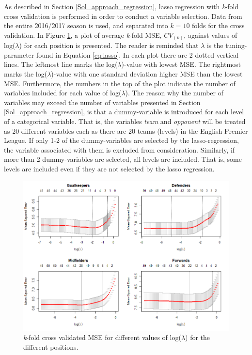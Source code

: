 As described in Section \ref{Sol_approach_regression}, lasso regression with \textit{k}-fold cross validation is performed in order to conduct a variable selection. Data from the entire 2016/2017 season is used, and separated into $\textit{k}=10$ folds for the cross validation. In Figure \ref{fig:lasso_all}, a plot of average \textit{k}-fold MSE, $CV_{(k)}$, against values of log($\lambda$) for each position is presented. The reader is reminded that $\lambda$ is the tuning-parameter found in Equation \ref{eq:lasso}. In each plot there are 2 dotted vertical lines. The leftmost line marks the log($\lambda$)-value with lowest MSE. The rightmost marks the log($\lambda$)-value with one standard deviation higher MSE than the lowest MSE. Furthermore, the numbers in the top of the plot indicate the number of variables included for each value of log($\lambda$). The reason why the number of variables may exceed the number of variables presented in Section \ref{Sol_approach_regression}, is that a dummy-variable is introduced for each level of a categorical variable. That is, the variables \textit{team} and \textit{opponent} will be treated as 20 different variables each as there are 20 teams (levels) in the English Premier League. If only 1-2 of the dummy-variables are selected by the lasso-regression, the variable associated with them is excluded from consideration. Similarly, if more than 2 dummy-variables are selected, all levels are included. That is, some levels are included even if they are not selected by the lasso regression.

\newpar

\begin{figure}[H]
    \centering
    \includegraphics[scale=0.55]{fig/chapter_6/lasso_all.png}
    \caption{\textit{k}-fold cross validated MSE for different values of log($\lambda$) for the different positions.}
\label{fig:lasso_all}    
\end{figure}

